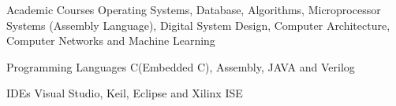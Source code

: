 \begin{cvskills}
	\cvskill
	{Academic Courses}
	{Operating Systems, Database, Algorithms, Microprocessor Systems (Assembly Language), Digital System Design, Computer Architecture, Computer Networks and Machine Learning}
	
	\cvskill
	{Programming Languages}
	{C(Embedded C), Assembly, JAVA and Verilog}
	
	\cvskill
	{IDEs}
	{Visual Studio, Keil, Eclipse and Xilinx ISE}
	
%
\end{cvskills}